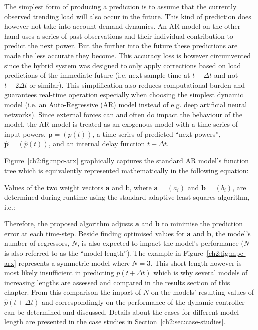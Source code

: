 The simplest form of producing a prediction is to assume that the currently observed trending load will also occur in the future.
This kind of prediction does however not take into account demand dynamics.
%
%
%
An AR model on the other hand uses a series of past observations and their individual contribution to predict the next power.
But the further into the future these predictions are made the less accurate they become.
This accuracy loss is however circumvented since the hybrid system was designed to only apply corrections based on load predictions of the immediate future (i.e. next sample time at $t+\Delta t$ and not $t+2\Delta t$ or similar).
This simplification also reduces computational burden and guarantees real-time operation especially when choosing the simplest dynamic model (i.e. an Auto-Regressive (AR) model instead of e.g. deep artificial neural networks).
Since external forces can and often do impact the behaviour of the model, the AR model is treated as an exogenous model with a time-series of input powers, $\textbf{p} = (p(t))$, a time-series of predicted ``next powers'', $\hat{\textbf{p}} = (\hat{p}(t))$, and an internal delay function $t-\Delta t$.



Figure~\ref{ch2:fig:mpc-arx} graphically captures the standard AR model's function tree which is equivalently represented mathematically in the following equation:



Values of the two weight vectors $\textbf{a}$ and $\textbf{b}$, where $\textbf{a} = (a_i)$ and $\textbf{b} = (b_i)$, are determined during runtime using the standard adaptive least squares algorithm, i.e.:



Therefore, the proposed algorithm adjusts $\textbf{a}$ and $\textbf{b}$ to minimise the prediction error at each time-step.
Beside finding optimised values for $\textbf{a}$ and $\textbf{b}$, the model's number of regressors, $N$, is also expected to impact the model's performance ($N$ is also referred to as the ``model length'').
The example in Figure~\ref{ch2:fig:mpc-arx} represents a symmetric model where $N=3$.
This short length however is most likely insufficient in predicting $p(t+\Delta t)$ which is why several models of increasing lengths are assessed and compared in the results section of this chapter.
From this comparison the impact of $N$ on the models' resulting values of $\hat{p}(t+\Delta t)$ and correspondingly on the performance of the dynamic controller can be determined and discussed.
Details about the cases for different model length are presented in the case studies in Section~\ref{ch2:sec:case-studies}.
